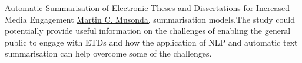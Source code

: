 \begin{abstract_online}{Automatic Summarisation of Electronic Theses and Dissertations for Increased Media Engagement }{%
        \underline{Martin C. Musonda,}}
summarisation models.The study could potentially provide useful information on the challenges of enabling the general public to engage with ETDs and how the application of NLP and automatic text summarisation can help overcome some of the challenges.
    \end{abstract_online}
    
